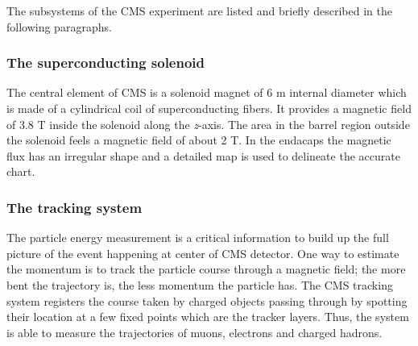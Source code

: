 The subsystems of the CMS experiment are listed and briefly described
in the following paragraphs.

\subsubsection{The superconducting solenoid}
The central element of CMS is a solenoid magnet of 6 m internal diameter
which is made of a cylindrical coil of superconducting fibers. It 
provides a magnetic field of 3.8 T inside the solenoid along the
\emph{z}-axis. The area in the barrel region outside the solenoid
feels a magnetic field of about 2 T.
In the endacaps the
magnetic flux has an irregular shape and a detailed map is used to
delineate the accurate chart.
\subsubsection{The tracking system}\label{sec:tracking}
The particle energy measurement is a critical information to build up the full
picture of the event happening at center of CMS detector. One way to
estimate the momentum is to track the particle course through a
magnetic field; the more bent the trajectory is, the less momentum the
particle has. The CMS tracking system registers the course taken by
charged objects passing through by spotting their location at a few
fixed points which are the tracker layers. 
Thus, the system is able to measure the trajectories of muons,
electrons and
charged hadrons.


